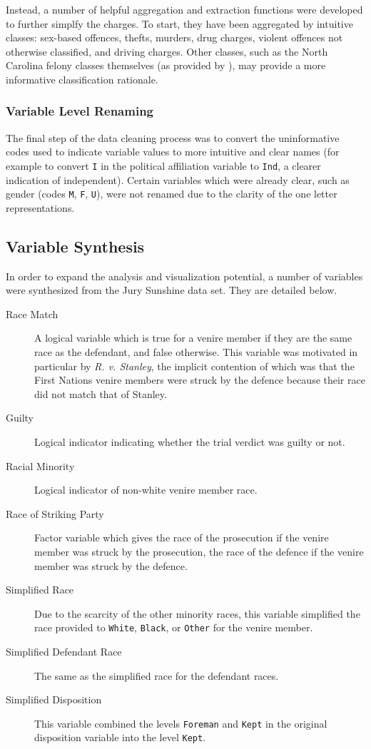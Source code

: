 Instead, a number of helpful aggregation and extraction functions were
developed to further simplfy the charges. To start, they have been aggregated by intuitive classes: sex-based offences, thefts,
murders, drug charges, violent offences not otherwise classified, and driving charges. Other classes, such as the North
Carolina felony classes themselves (as provided by \cite{offenseclass}), may provide a more informative classification rationale.

\subsubsection{Variable Level Renaming}

The final step of the data cleaning process was to convert the uninformative codes used to indicate variable values to more
intuitive and clear names (for example to convert \texttt{I} in the political affiliation variable to \texttt{Ind}, a clearer indication of
independent). Certain variables which were already clear, such as gender (codes \texttt{M}, \texttt{F}, \texttt{U}), were not renamed due to the
clarity of the one letter representations.

\subsection{Variable Synthesis}

In order to expand the analysis and visualization potential, a number of variables were synthesized from the Jury
Sunshine data set. They are detailed below.

\begin{description}
  \item[Race Match] A logical variable which is true for a venire member if they are the same race as the defendant, and false
    otherwise. This variable was motivated in particular by
    \textit{R. v. Stanley}, the implicit contention of which was that the First Nations venire members were struck by the defence because their
    race did not match that of Stanley.
  \item[Guilty] Logical indicator indicating whether the trial verdict
    was guilty or not.
  \item[Racial Minority] Logical indicator of non-white venire member race.
  \item[Race of Striking Party] Factor variable which gives the race of the prosecution if the venire member was struck by the
    prosecution, the race of the defence if the venire member was struck by the defence.
  \item[Simplified Race] Due to the scarcity of the other minority races, this variable simplified the race provided to \texttt{White},
    \texttt{Black}, or \texttt{Other} for the venire member.
  \item[Simplified Defendant Race] The same as the simplified race for the defendant races.
  \item[Simplified Disposition] This variable combined the levels \texttt{Foreman} and \texttt{Kept} in the original disposition
    variable into the level \texttt{Kept}.
\end{description}

